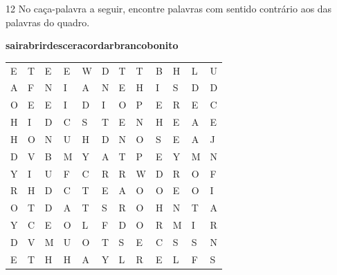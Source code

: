 \num{12} No caça-palavra a seguir, encontre palavras com sentido contrário aos das palavras do quadro.

\begin{myquote}
\textbf{sair}\hfill \textbf{abrir}\hfill \textbf{descer}\hfill \textbf{acordar}\hfill \textbf{branco}\hfill \textbf{bonito}\hfill
\end{myquote}

\begin{center}
\begin{tabular}{llllllllllll}
E & T & E & E & W & D & T & T & B & H & L & U\\

A & F & N & I & A & N & E & H & I & S & D & D\\

O & E & E & I & D & I & O & P & E & R & E & C\\

H & I & D & C & S & T & E & N & H & E & A & E\\

H & O & N & U & H & D & N & O & S & E & A & J\\

D & V & B & M & Y & A & T & P & E & Y & M & N\\

Y & I & U & F & C & R & R & W & D & R & O & F\\

R & H & D & C & T & E & A & O & O & E & O & I\\

O & T & D & A & T & S & R & O & H & N & T & A\\

Y & C & E & O & L & F & D & O & R & M & I & R\\

D & V & M & U & O & T & S & E & C & S & S & N\\

E & T & H & H & A & Y & L & R & E & L & F & S
\end{tabular}
\end{center}
\pagebreak
